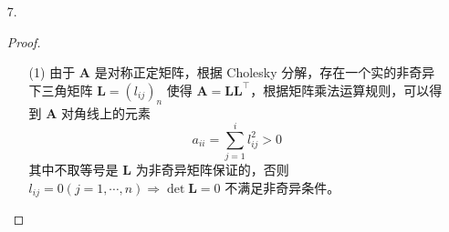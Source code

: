 \documentclass{sjtuarticle}
\begin{document}
\begin{itemize}
\begin{proof}
\begin{align*}
            \sum_{\substack{j=2\\j\neq i}}^n \left|a_{ij}^{(2)}\right|&=\sum_{\substack{j=2\\j\neq i}}^n \left|a_{ij}-\frac{a_{i1}}{a_{11}}a_{1j}\right| & & \text{式 \eqref{eq:a22}}\\
            &=\sum_{\substack{j=2\\j\neq i}}^n \left(|a_{ij}|+\left|\frac{a_{i1}}{a_{11}}a_{1j}\right|\right) & &\text{三角不等式} |a\pm b|\leq |a|+|b|\\
            &=\sum_{\substack{j=2\\j\neq i}}^n |a_{ij}|+ \frac{|a_{i1}|}{|a_{11}|}\sum_{\substack{j=2\\j\neq i}}^n\left|a_{1j}\right|\\
            &<|a_{ii}|-|a_{i1}|+\frac{|a_{i1}|}{|a_{11}|}\sum_{\substack{j=2\\j\neq i}}^n \left|a_{1j}\right| && \text{式 \eqref{eq:aii}}\\
            &<|a_{ii}|-|a_{i1}|+\frac{|a_{i1}|}{|a_{11}|}(|a_{11}|-|a_{1i}|) && \text{式 \eqref{eq:a11}}\\
            &=|a_{ii}|-\frac{|a_{i1}|}{|a_{11}|}|a_{1i}|\\
            &\leq \left|a_{ii}-\frac{a_{i1}}{a_{11}}a_{1i}\right| && \text{不等式} |a|-|b|\leq \left||a|-|b|\right|\leq |a\pm b|\\
            &=\left|a_{ii}^{(2)}\right| && \text{式 \eqref{eq:a22ii}}
        \end{align*}
        这就证明了矩阵 $\bm{A}_2$ 是对角占优阵。
        
        结合习题 2 的结论和数学归纳法，对于对称的对角占优阵来说，用高斯消去法每一步产生的右下角矩阵都是对称的对角占优阵，对角占优性将保证小矩阵的第一个元素的绝对值是同行中最大的，结合对称性，将是同列中最大的，则其在列主元中也将被选为主元，从而得到与列主元消去法同样的计算过程。
    \end{proof}
    \item[7.] \begin{proof}
        \begin{itemize}
            \item[(1)] 由于 $\bm{A}$ 是对称正定矩阵，根据 Cholesky 分解，存在一个实的非奇异下三角矩阵 $\bm{L}=(l_{ij})_n$ 使得 $\bm{A}=\bm{L}\bm{L}^\top$，根据矩阵乘法运算规则，可以得到 $\bm{A}$ 对角线上的元素
            \begin{equation*}
                a_{ii}=\sum_{j=1}^i l_{ij}^2 > 0
            \end{equation*}
            其中不取等号是 $\bm{L}$ 为非奇异矩阵保证的，否则 $l_{ij}=0 (j=1,\cdots, n) \Rightarrow \det \bm{L}=0$ 不满足非奇异条件。


\end{itemize}
\end{proof}
\end{itemize}
\end{document}
